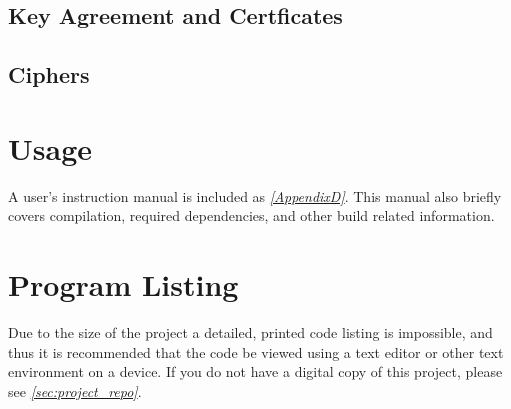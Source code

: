   \subsection{Key Agreement and Certficates}
  
  \subsection{Ciphers}

\section{Usage}

  A user's instruction manual is included as \emph{\textsection \ref{AppendixD}}. This manual also briefly covers compilation, required dependencies, and other build related information.

\section{Program Listing}

  Due to the size of the project a detailed, printed code listing is impossible, and thus it is recommended that the code be viewed using a text editor or other text environment on a device. If you do not have a digital copy of this project, please see \emph{\textsection \ref{sec:project_repo}}.